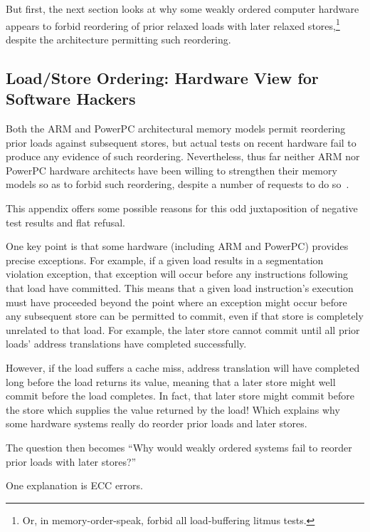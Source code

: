 \documentclass[10]{article}
\begin{document}
But first, the next section looks at why some weakly ordered
computer hardware appears to forbid reordering of prior relaxed loads with
later relaxed stores,\footnote{
	Or, in memory-order-speak, forbid all load-buffering litmus tests.}
despite the architecture permitting such reordering.

\subsection{Load/Store Ordering: Hardware View for Software Hackers}
\label{sec:Load/Store Ordering: Hardware View for Software Hackers}

Both the ARM and PowerPC architectural memory models permit reordering prior loads
against subsequent stores, but actual tests on recent hardware fail to
produce any evidence of such reordering.
Nevertheless, thus far neither ARM nor PowerPC hardware architects
have been willing to strengthen their memory models so as to forbid
such reordering, despite a number of requests to do
so~\cite{RichardGrisenthwaite2023TightenRelaxedJustSayNo}.

This appendix offers some possible reasons for this odd juxtaposition
of negative test results and flat refusal.

One key point is that some hardware (including ARM and PowerPC) provides
precise exceptions.
For example, if a given load results in a segmentation violation
exception, that exception will occur before any instructions following
that load have committed.
This means that a given load instruction's execution must have proceeded
beyond the point where an exception might occur before any subsequent
store can be permitted to commit, even if that store is completely
unrelated to that load.
For example, the later store cannot commit until all prior loads' address
translations have completed successfully.

However, if the load suffers a cache miss, address translation will have
completed long before the load returns its value, meaning that a later
store might well commit before the load completes.
In fact, that later store might commit before the store which supplies the
value returned by the load!
Which explains why some hardware systems really do reorder prior loads
and later stores.

The question then becomes ``Why would weakly ordered systems fail to
reorder prior loads with later stores?''

One explanation is ECC errors.
\end{document}
